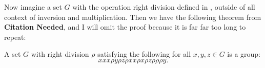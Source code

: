 \documentclass{article}
\begin{document}
Now imagine a set $G$ with the operation right division defined in , outside of all context of inversion and multiplication.
Then we have the following theorem from \textbf{Citation Needed}, and I will omit the proof because it is far far too long to repeat:
\begin{theorem}
  A set $G$ with right division $\rho$ satisfying the following for all $x, y, z \in G$ is a group:
  \[
    x x x \rho y \rho z \rho x x \rho x \rho z \rho \rho \rho y.
  \]
\end{theorem}
\end{document}
